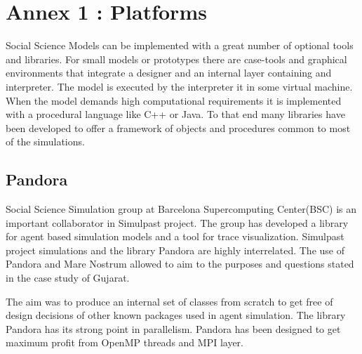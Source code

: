 \documentclass[11pt,oneside,a4paper,openright]{report}
\begin{document}
\chapter{Annex 1 : Platforms}

Social Science Models can be implemented with a great number of optional tools and libraries.
For small models or prototypes there are case-tools and graphical environments that 
integrate a designer and an internal layer containing and interpreter. The model is executed
by the interpreter it in some virtual machine. When the model demands high computational 
requirements it is implemented with a procedural language like C++ or Java. To that end many 
libraries have been developed to offer a framework of objects and procedures common to most of the simulations.

\section{Pandora}

Social Science Simulation group at Barcelona Supercomputing Center(BSC) is an important collaborator
in Simulpast project. The group has developed a library for agent based simulation models and a tool for 
trace visualization. Simulpast project simulations and the library Pandora are highly interrelated. The use 
of Pandora and Mare Nostrum allowed to aim to the purposes and questions stated in the case study of Gujarat.

The aim was to produce an internal set of classes from scratch to get free of design decisions of other known packages used in agent simulation. The library Pandora has its strong point in parallelism. Pandora has been designed to get maximum profit from OpenMP threads and MPI layer. 
\end{document}
